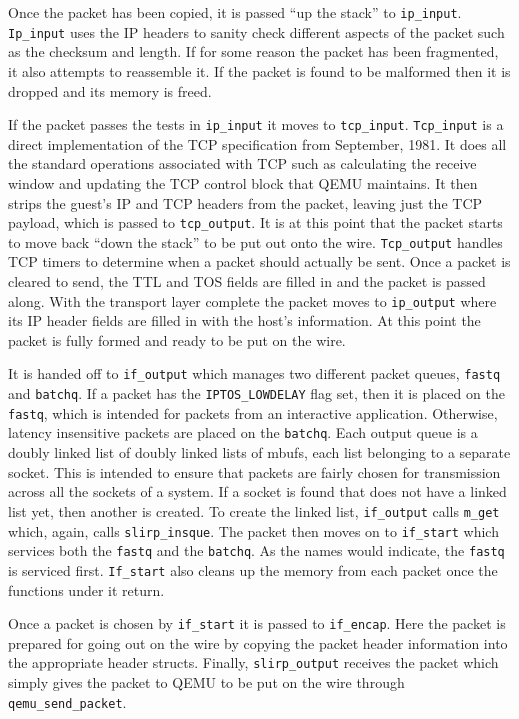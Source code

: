 Once the packet has been copied, it is passed ``up the stack'' to \texttt{ip\_input}. 
\texttt{Ip\_input} uses the IP headers to sanity check different aspects of the packet such as the checksum and length.
If for some reason the packet has been fragmented, it also attempts to reassemble it.
If the packet is found to be malformed then it is dropped and its memory is freed.

If the packet passes the tests in \texttt{ip\_input} it moves to \texttt{tcp\_input}.
\texttt{Tcp\_input} is a direct implementation of the TCP specification from September, 1981.
It does all the standard operations associated with TCP such as calculating the receive window and updating the TCP control block that QEMU maintains.
It then strips the guest's IP and TCP headers from the packet, leaving just the TCP payload, which is passed to \texttt{tcp\_output}.
It is at this point that the packet starts to move back ``down the stack'' to be put out onto the wire.
\texttt{Tcp\_output} handles TCP timers to determine when a packet should actually be sent.
Once a packet is cleared to send, the TTL and TOS fields are filled in and the packet is passed along.
With the transport layer complete the packet moves to \texttt{ip\_output} where its IP header fields are filled in with the host's information.
At this point the packet is fully formed and ready to be put on the wire.

It is handed off to \texttt{if\_output} which manages two different packet queues, \texttt{fastq} and \texttt{batchq}.
If a packet has the \texttt{IPTOS\_LOWDELAY} flag set, then it is placed on the \texttt{fastq}, which is intended for packets from an interactive application.
Otherwise, latency insensitive packets are placed on the \texttt{batchq}.
Each output queue is a doubly linked list of doubly linked lists of mbufs, each list belonging to a separate socket.
This is intended to ensure that packets are fairly chosen for transmission across all the sockets of a system.
If a socket is found that does not have a linked list yet, then another is created.
To create the linked list, \texttt{if\_output} calls \texttt{m\_get} which, again, calls \texttt{slirp\_insque}.
The packet then moves on to \texttt{if\_start} which services both the \texttt{fastq} and the \texttt{batchq}.
As the names would indicate, the \texttt{fastq} is serviced first.
\texttt{If\_start} also cleans up the memory from each packet once the functions under it return.

Once a packet is chosen by \texttt{if\_start} it is passed to \texttt{if\_encap}.
Here the packet is prepared for going out on the wire by copying the packet header information into the appropriate header structs.
Finally, \texttt{slirp\_output} receives the packet which simply gives the packet to QEMU to be put on the wire through \texttt{qemu\_send\_packet}. 

